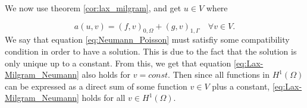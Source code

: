 We now use theorem \ref{cor:lax_milgram}, and get $u\in V$ where

\begin{equation}\label{eq:Lax-Milgram_Neumann}
  a(u,v) = (f,v)_{0,\Omega} + (g,v)_{1,\Gamma} \quad \forall v\in V.  
\end{equation}
We say that equation \ref{eq:Neumann_Poisson} must satisfiy some compatibility condition in order to have a solution. This is due to the fact that the solution is only unique up to a constant. From this, we get that equation \ref{eq:Lax-Milgram_Neumann} also holds for $v=const$.
Then since all functions in $H^1(\Omega)$ can be expressed as a direct sum of some function $v\in V$ plus a constant, \ref{eq:Lax-Milgram_Neumann} holds for all $v\in H^1(\Omega)$.